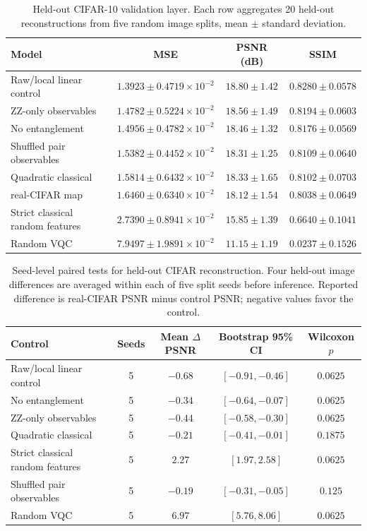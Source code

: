 \documentclass[11pt]{article}
\DeclareRobustCommand{\blue}[1]{\leavevmode{\color{blue}#1}}
\begin{document}
\begin{table}[H]
\centering
\caption{Held-out CIFAR-10 validation layer. Each row aggregates 20 held-out reconstructions from five random image splits, mean $\pm$ standard deviation.}
\label{tab:hvk_real_cifar}
\scriptsize
\begin{tabular}{lccc}
\toprule
Model & MSE & PSNR (dB) & SSIM \\
\midrule
Raw/local linear control & $1.3923{\pm}0.4719\times10^{-2}$ & $18.80{\pm}1.42$ & $0.8280{\pm}0.0578$ \\
ZZ-only observables & $1.4782{\pm}0.5224\times10^{-2}$ & $18.56{\pm}1.49$ & $0.8194{\pm}0.0603$ \\
No entanglement & $1.4956{\pm}0.4782\times10^{-2}$ & $18.46{\pm}1.32$ & $0.8176{\pm}0.0569$ \\
Shuffled pair observables & $1.5382{\pm}0.4452\times10^{-2}$ & $18.31{\pm}1.25$ & $0.8109{\pm}0.0640$ \\
Quadratic classical & $1.5814{\pm}0.6432\times10^{-2}$ & $18.33{\pm}1.65$ & $0.8102{\pm}0.0703$ \\
\blue{PCAE2D} real-CIFAR map & $1.6460{\pm}0.6340\times10^{-2}$ & $18.12{\pm}1.54$ & $0.8038{\pm}0.0649$ \\
Strict classical random features & $2.7390{\pm}0.8941\times10^{-2}$ & $15.85{\pm}1.39$ & $0.6640{\pm}0.1041$ \\
Random VQC & $7.9497{\pm}1.9891\times10^{-2}$ & $11.15{\pm}1.19$ & $0.0237{\pm}0.1526$ \\
\bottomrule
\end{tabular}
\end{table}

\begin{table}[H]
\centering
\caption{Seed-level paired tests for held-out CIFAR reconstruction. Four held-out image differences are averaged within each of five split seeds before inference. Reported difference is \blue{PCAE2D} real-CIFAR PSNR minus control PSNR; negative values favor the control.}
\label{tab:hvk_real_cifar_stats}
\scriptsize
\begin{tabular}{lcccc}
\toprule
Control & Seeds & Mean $\Delta$PSNR & Bootstrap 95\% CI & Wilcoxon $p$ \\
\midrule
Raw/local linear control & 5 & $-0.68$ & $[-0.91,-0.46]$ & $0.0625$ \\
No entanglement & 5 & $-0.34$ & $[-0.64,-0.07]$ & $0.0625$ \\
ZZ-only observables & 5 & $-0.44$ & $[-0.58,-0.30]$ & $0.0625$ \\
Quadratic classical & 5 & $-0.21$ & $[-0.41,-0.01]$ & $0.1875$ \\
Strict classical random features & 5 & $2.27$ & $[1.97,2.58]$ & $0.0625$ \\
Shuffled pair observables & 5 & $-0.19$ & $[-0.31,-0.05]$ & $0.125$ \\
Random VQC & 5 & $6.97$ & $[5.76,8.06]$ & $0.0625$ \\
\bottomrule
\end{tabular}
\end{table}
\end{document}
